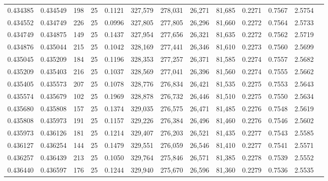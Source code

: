 \begin{tabular}{rrrrrrrrrrrrr}
0.434385 & 0.434549 &   198 &  25 &                                     0.1121 & 327,579 & 278,031 &  26,271 &  81,685 & 0.2271 & 0.7567 & 2.5754 \\
0.434552 & 0.434749 &   226 &  25 &                                     0.0996 & 327,805 & 277,805 &  26,296 &  81,660 & 0.2272 & 0.7564 & 2.5733 \\
0.434749 & 0.434875 &   149 &  25 &                                     0.1437 & 327,954 & 277,656 &  26,321 &  81,635 & 0.2272 & 0.7562 & 2.5719 \\
0.434876 & 0.435044 &   215 &  25 &                                     0.1042 & 328,169 & 277,441 &  26,346 &  81,610 & 0.2273 & 0.7560 & 2.5699 \\
0.435045 & 0.435209 &   184 &  25 &                                     0.1196 & 328,353 & 277,257 &  26,371 &  81,585 & 0.2274 & 0.7557 & 2.5682 \\
0.435209 & 0.435403 &   216 &  25 &                                     0.1037 & 328,569 & 277,041 &  26,396 &  81,560 & 0.2274 & 0.7555 & 2.5662 \\
0.435405 & 0.435573 &   207 &  25 &                                     0.1078 & 328,776 & 276,834 &  26,421 &  81,535 & 0.2275 & 0.7553 & 2.5643 \\
0.435574 & 0.435679 &   102 &  25 &                                     0.1969 & 328,878 & 276,732 &  26,446 &  81,510 & 0.2275 & 0.7550 & 2.5634 \\
0.435680 & 0.435808 &   157 &  25 &                                     0.1374 & 329,035 & 276,575 &  26,471 &  81,485 & 0.2276 & 0.7548 & 2.5619 \\
0.435808 & 0.435973 &   191 &  25 &                                     0.1157 & 329,226 & 276,384 &  26,496 &  81,460 & 0.2276 & 0.7546 & 2.5602 \\
0.435973 & 0.436126 &   181 &  25 &                                     0.1214 & 329,407 & 276,203 &  26,521 &  81,435 & 0.2277 & 0.7543 & 2.5585 \\
0.436127 & 0.436254 &   144 &  25 &                                     0.1479 & 329,551 & 276,059 &  26,546 &  81,410 & 0.2277 & 0.7541 & 2.5571 \\
0.436257 & 0.436439 &   213 &  25 &                                     0.1050 & 329,764 & 275,846 &  26,571 &  81,385 & 0.2278 & 0.7539 & 2.5552 \\
0.436440 & 0.436597 &   176 &  25 &                                     0.1244 & 329,940 & 275,670 &  26,596 &  81,360 & 0.2279 & 0.7536 & 2.5535 \\

\end{tabular}
